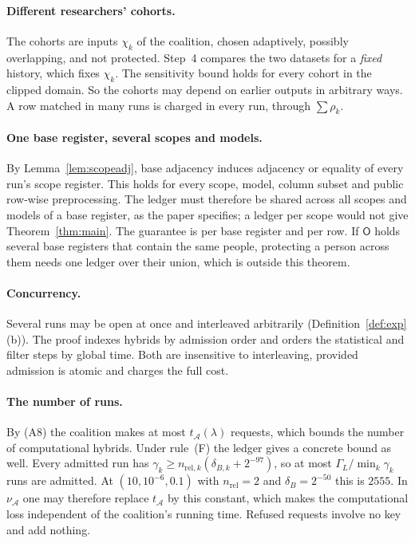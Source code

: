 \documentclass[11pt]{article}
\theoremstyle{definition}
\theoremstyle{plain}
\newcommand{\Op}{\mathsf{O}}
\newcommand{\nrel}{n_{\mathrm{rel}}}
\begin{document}
\paragraph{Different researchers' cohorts.} The cohorts are inputs $\chi_k$ of the coalition, chosen adaptively, possibly overlapping, and not protected. Step~4 compares the two datasets for a \emph{fixed} history, which fixes $\chi_k$. The sensitivity bound holds for every cohort in the clipped domain. So the cohorts may depend on earlier outputs in arbitrary ways. A row matched in many runs is charged in every run, through $\sum\rho_k$.

\paragraph{One base register, several scopes and models.} By Lemma~\ref{lem:scopeadj}, base adjacency induces adjacency or equality of every run's scope register. This holds for every scope, model, column subset and public row-wise preprocessing. The ledger must therefore be shared across all scopes and models of a base register, as the paper specifies; a ledger per scope would not give Theorem~\ref{thm:main}. The guarantee is per base register and per row. If $\Op$ holds several base registers that contain the same people, protecting a person across them needs one ledger over their union, which is outside this theorem.

\paragraph{Concurrency.} Several runs may be open at once and interleaved arbitrarily (Definition~\ref{def:exp}(b)). The proof indexes hybrids by admission order and orders the statistical and filter steps by global time. Both are insensitive to interleaving, provided admission is atomic and charges the full cost.

\paragraph{The number of runs.} By (A8) the coalition makes at most $t_{\mathcal A}(\lambda)$ requests, which bounds the number of computational hybrids. Under rule~(F) the ledger gives a concrete bound as well. Every admitted run has $\gamma_k\ge n_{\mathrm{rel},k}(\delta_{B,k}+2^{-97})$, so at most $\Gamma_L/\min_k\gamma_k$ runs are admitted. At $(10,10^{-6},0.1)$ with $\nrel=2$ and $\delta_B=2^{-50}$ this is $2555$. In $\nu_{\mathcal A}$ one may therefore replace $t_{\mathcal A}$ by this constant, which makes the computational loss independent of the coalition's running time. Refused requests involve no key and add nothing.
\end{document}
